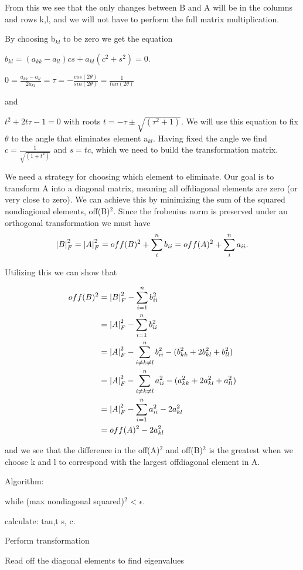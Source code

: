 From this we see that the only changes between B and A will be in the columns
and rows k,l, and we will not have to perform the full matrix multiplication.

By choosing b$_{kl}$ to be zero we get the equation

$b_{kl} = (a_{kk}-a_{ll})cs + a_{kl} (c^2 + s^2) = 0$.

$0 = \frac{a_{kk} - a_{ll}}{2a_{kl}} = \tau = -\frac{cos(2\theta)}{sin(2\theta)} = \frac{1}{tan(2\theta)}$

and

$t^2 + 2t\tau -1 = 0$ with roots $t = -\tau \pm \sqrt{(\tau^2 + 1)}$. We will
use this equation to fix $\theta$ to the angle that eliminates element a$_{kl}$.
Having fixed the angle we find $c = \frac{1}{\sqrt{(1+t^2)}}$ and $s = tc$, which
we need to build the transformation matrix.

We need a strategy for choosing which element to eliminate. Our goal is to
transform A into a diagonal matrix, meaning all offdiagonal elements are zero
(or very close to zero). We can achieve this by minimizing the sum of the
squared nondiagional elements, off(B)$^2$. Since the frobenius norm is
preserved under an orthogonal transformation we must have
$$ \abs{B}_F^2 = \abs{A}_F^2 =  off(B)^2 + \sum_{i}^{n} b_{ii} = off(A)^2 + \sum_{i}^{n} a_{ii}.$$

Utilizing this we can show that

\begin{align*}
  off(B)^2 &= \abs{B}_F^2 - \sum_{i=1}^{n} b_{ii}^2 \\
  &= \abs{A}_F^2 - \sum_{i=1}^{n} b_{ii}^2 \\
  &= \abs{A}_F^2 - \sum_{i \neq k \neq l}^{n} b_{ii}^2 - (b_{kk}^2 + 2b_{kl}^2 + b_{ll}^2) \\
  &= \abs{A}_F^2 - \sum_{i\neq k \neq l}^{n} a_{ii}^2 - (a_{kk}^2 + 2a_{kl}^2 + a_{ll}^2) \\
  &= \abs{A}_F^2 - \sum_{i=1}^{n} a_{ii}^2 - 2a_{kl}^2 \\
  &= off(A)^2 - 2a_{kl}^2
\end{align*}

and we see that the difference in the off(A)$^2$ and off(B)$^2$ is the greatest
when we choose k and l to correspond with the largest offdiagonal element in A.




Algorithm:

while (max nondiagonal squared)$^2$ < $\epsilon$.

  calculate: tau,t s, c.

  Perform transformation

Read off the diagonal elements to find eigenvalues
